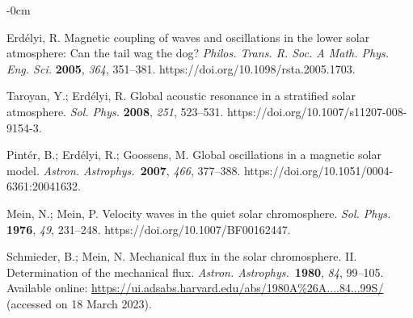\documentclass[physics,article,accept,pdftex,moreauthors]{Definitions/mdpi}
\newcommand{\aap}{{\it Astron. Astrophys.}}
\begin{document}
\begin{adjustwidth}{-\extralength}{0cm}
	
	
	
	
	\begin{thebibliography}{999}
		
		 Erd\'elyi, R. Magnetic coupling of waves and oscillations in the lower solar atmosphere: 
Can 
the tail wag the dog? \emph{Philos. Trans. R. Soc. A Math. Phys. Eng. Sci.} \textbf{2005}, \emph{364}, 351--381. https://doi.org/10.1098/rsta.2005.1703.
		
		 Taroyan, Y.; Erd\'elyi, R. Global acoustic resonance in a stratified 
solar atmosphere. \emph{Sol. Phys.} \textbf{2008}, \emph{251}, 523--531. https://doi.org/10.1007/s11207-008-9154-3.
		
		 Pint\'er, B.; Erd\'elyi, R.; Goossens, M. Global oscillations in a magnetic 
solar model. \aap~\textbf{2007}, \emph{466}, 377--388. https://doi.org/10.1051/0004-6361:20041632.
		
		Mein, N.; Mein, P.  {Velocity waves in the quiet solar chromosphere.}%
		 \emph{Sol. Phys.} \textbf{1976}, \emph{49}, 231{--248.} https://doi.org/10.1007/BF00162447.
		
		 Schmieder, B.; Mein, N. {Mechanical flux in the solar chromosphere. II. 
Determination of the mechanical flux}. \aap~\textbf{1980}, \emph{84}, 99{--105.}
{Available online:} \url{https://ui.adsabs.harvard.edu/abs/1980A%26A....84...99S/} (accessed on 18 March 2023).
		

\end{thebibliography}
\end{adjustwidth}
\end{document}
